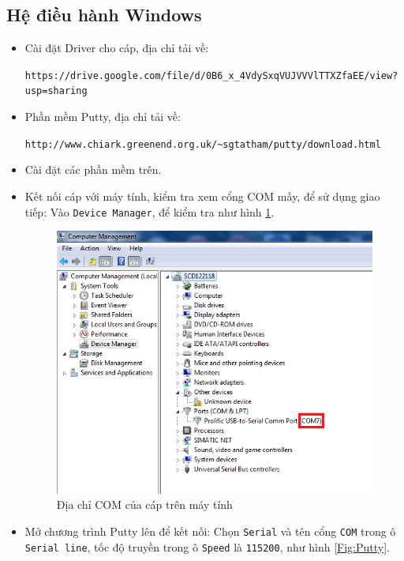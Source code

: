\subsection{Hệ điều hành Windows}
\begin{itemize}
\item Cài đặt Driver cho cáp, địa chỉ tải về:

\begin{footnotesize}
\verb|https://drive.google.com/file/d/0B6_x_4VdySxqVUJVVVlTTXZfaEE/view?usp=sharing|
\end{footnotesize}
\item Phần mềm Putty, địa chỉ tải về:

\begin{footnotesize}
\verb|http://www.chiark.greenend.org.uk/~sgtatham/putty/download.html|
\end{footnotesize}
\item Cài đặt các phần mềm trên.
\item Kết nối cáp với máy tính, kiểm tra xem cổng COM mấy, để sử dụng giao tiếp: Vào \verb|Device Manager|, để kiểm tra như hình \ref{Fig:COM7}.
\begin{figure}[!h]
\begin{center}
\includegraphics[scale=.5]{remote/images/COM7-Putty}
\end{center}
\caption{Địa chỉ COM của cáp trên máy tính}\label{Fig:COM7}
\end{figure}
\newpage
\item Mở chương trình Putty lên để kết nối: Chọn \verb|Serial| và tên cổng \verb|COM| trong ô \verb|Serial line|, tốc độ truyền trong ô \verb|Speed| là \verb|115200|, như hình \ref{Fig:Putty}.

\end{itemize}
